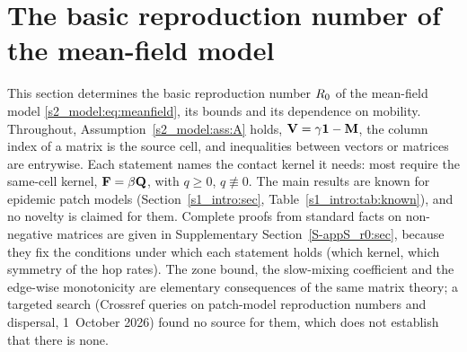 \section{The basic reproduction number of the mean-field model}\label{s3_r0:sec}

This section determines the basic reproduction number $R_0$ of the mean-field model
\eqref{s2_model:eq:meanfield}, its bounds and its dependence on mobility. Throughout, Assumption~\ref{s2_model:ass:A}
holds, $\mathbf{V}=\gamma\mathbf{1}-\mathbf{M}$, the column index of a matrix is the source cell, and inequalities between vectors
or matrices are entrywise. Each statement names the contact kernel it needs: most require the same-cell
kernel, $\mathbf{F}=\beta\mathbf{Q}$, with $q\ge0$, $q\not\equiv0$. The main results are known for epidemic patch models
(Section~\ref{s1_intro:sec}, Table~\ref{s1_intro:tab:known}), and no novelty is claimed for them. Complete proofs
from standard facts on non-negative matrices are given in Supplementary Section~\ref{S-appS_r0:sec}, because
they fix the conditions under which each statement holds (which kernel, which symmetry of the hop rates). The
zone bound, the slow-mixing coefficient and the edge-wise monotonicity are elementary consequences of the same
matrix theory; a targeted search (Crossref queries on patch-model reproduction numbers and dispersal,
1~October 2026) found no source for them, which does not establish that there is none.

